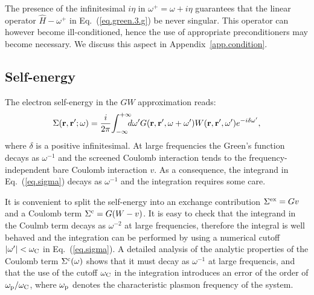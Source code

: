 \documentclass[twocolumn,prb,showpacs,superscriptaddress]{revtex4}
\def\w{\omega}
\def\wp{\omega^\prime}
\def\wc{{\omega_{\rm C}}}
\def\H{\hat{H}}
\def\r{{\bf r}}
\def\rp{{\bf r^\prime}}
\begin{document}
The presence of the infinitesimal $i\eta$ in $\w^+=\w+i\eta$ 
guarantees that the linear operator $\H-\w^+$ in Eq.\ (\ref{eq.green.3.g}) be 
never singular.
This operator can however become ill-conditioned, hence the use of appropriate
preconditioners may become necessary. We discuss this aspect 
in Appendix~\ref{app.condition}.

\subsection{Self-energy}\label{sec.sigma}

The electron self-energy in the $GW$ approximation reads:\cite{hl86}
  \begin{equation} \label{eq.sigma}
  \Sigma(\r,\rp;\w) = \frac{i}{2\pi} \! \int_{-\infty}^{+\infty} \!\!\!\!d\wp 
    G(\r,\rp,\w+\wp) W(\r,\rp,\wp) e^{-i\delta\wp},
  \end{equation}
where $\delta$ is a positive infinitesimal. 
At large frequencies the Green's function decays as $\w^{-1}$ and 
the screened Coulomb interaction tends to the frequency-independent
bare Coulomb interaction $v$. As a consequence, the integrand in Eq.\ (\ref{eq.sigma}) 
decays as $\w^{-1}$ and the integration requires some care.

It is convenient to split the self-energy into an exchange contribution 
$\Sigma^{\rm ex}=Gv$ and a Coulomb term $\Sigma^{\rm c}=G(W-v)$.\cite{blochl}
It is easy to check that the integrand in the Coulmb term decays as 
$\w^{-2}$ at large frequencies, therefore the integral is well behaved and the 
integration can be performed by using a numerical cutoff $|\wp|< \wc$ 
in Eq.\ (\ref{eq.sigma}).
A detailed analysis of the analytic properties of the Coulomb term
$\Sigma^{\rm c}(\w)$ shows that it must decay as $\w^{-1}$ 
at large frequencis, and that the use of the cutoff $\wc$ in the integration 
introduces an error of the order of $\w_{\rm p}/\wc$, where $\w_{\rm p}$ denotes
the characteristic plasmon frequency of the system.
\end{document}

